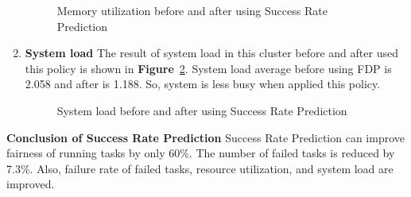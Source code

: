 \documentclass[12pt,oneside,openright,a4paper]{cpe-english-project}
\begin{document}
\begin{enumerate}
\begin{figure}[!h]
    \setlength{\fboxsep}{0cm}
    \caption{Memory utilization before and after using Success Rate Prediction}\label{fig:mem2}
\end{figure}

  \item \textbf{System load}
  \newline
  The result of system load in this cluster before and after used this policy is shown in \textbf{Figure}~\ref{fig:load2}. System load average before using FDP is 2.058 and after is 1.188. So, system is less busy when applied this policy.
\begin{figure}[!h]\centering
    \setlength{\fboxrule}{0mm} %
    \setlength{\fboxsep}{0cm}
    \caption{System load before and after using Success Rate Prediction}\label{fig:load2}
\end{figure}
\end{enumerate}
\textbf{Conclusion of Success Rate Prediction}
\newline
\hspace{10mm}Success Rate Prediction can improve fairness of running tasks by only 60\%. The number of failed tasks is reduced by 7.3\%. Also, failure rate of failed tasks, resource utilization, and system load are improved.
\end{document}
